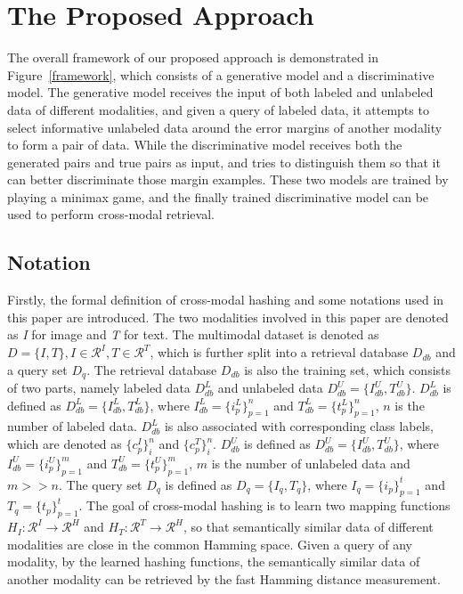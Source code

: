\documentclass[journal]{IEEEtran}
\begin{document}
\section{The Proposed Approach}
The overall framework of our proposed approach is demonstrated in Figure~\ref{framework}, which consists of a generative model and a discriminative model. The generative model receives the input of both labeled and unlabeled data of different modalities, and given a query of labeled data, it attempts to select informative unlabeled data around the error margins of another modality to form a pair of data. While the discriminative model receives both the generated pairs and true pairs as input, and tries to distinguish them so that it can better discriminate those margin examples. These two models are trained by playing a minimax game, and the finally trained discriminative model can be used to perform cross-modal retrieval.

\subsection{Notation}
Firstly, the formal definition of cross-modal hashing and some notations used in this paper are introduced. The two modalities involved in this paper are denoted as \textit{I} for image and \textit{T} for text. The multimodal dataset is denoted as $D=\{I,T\}, I\in \mathcal{R}^I, T\in \mathcal{R}^T$, which is further split into a retrieval database $D_{db}$ and a query set $D_{q}$. The retrieval database $D_{db}$ is also the training set, which consists of two parts, namely labeled data $D_{db}^L$ and unlabeled data $D_{db}^U = \{I_{db}^U,T_{db}^U\}$. $D_{db}^L$ is defined as $D_{db}^L = \{I_{db}^L,T_{db}^L\}$, where $I_{db}^L = \{i_p^L\}_{p=1}^n$ and $T_{db}^L = \{t_p^L\}_{p=1}^n$, $n$ is the number of labeled data. $D_{db}^L$ is also associated with corresponding class labels, which are denoted as $\{c_p^I\}_i^n$ and $\{c_p^T\}_i^n$. $D_{db}^U$ is defined as $D_{db}^U = \{I_{db}^U,T_{db}^U\}$, where $I_{db}^U = \{i_p^U\}_{p=1}^m$ and $T_{db}^U = \{t_p^U\}_{p=1}^m$, $m$ is the number of unlabeled data and $m>>n$. The query set $D_{q}$ is defined as $D_{q}=\{I_{q},T_{q}\}$, where $I_{q} = \{i_p\}_{p=1}^t$ and $T_{q} = \{t_p\}_{p=1}^t$. The goal of cross-modal hashing is to learn two mapping functions $H_I: \mathcal{R}^I\rightarrow \mathcal{R}^H$ and $H_T: \mathcal{R}^T\rightarrow \mathcal{R}^H$, so that semantically similar data of different modalities are close in the common Hamming space. Given a query of any modality, by the learned hashing functions, the semantically similar data of another modality can be retrieved by the fast Hamming distance measurement.
\end{document}
